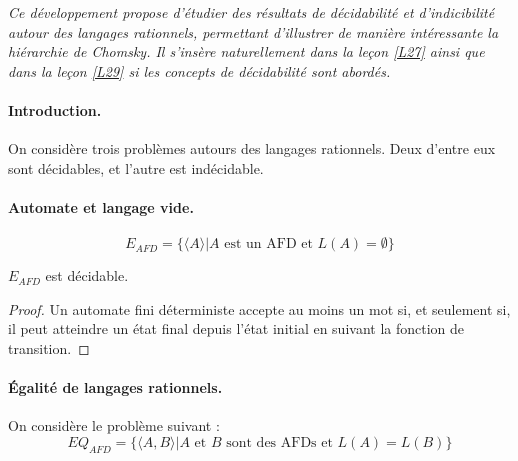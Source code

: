 

\textit{
Ce développement propose d'étudier des résultats de décidabilité et d’indicibilité autour des langages rationnels, permettant d'illustrer de manière intéressante la hiérarchie de Chomsky. Il s'insère naturellement dans la leçon \ref{L27} ainsi que dans la leçon \ref{L29} si les concepts de décidabilité sont abordés.}

\paragraph{Introduction.} On considère trois problèmes autours des langages rationnels. Deux d'entre eux sont décidables, et l'autre est indécidable.

\paragraph{Automate et langage vide.}
$$
E_{AFD} = \{\langle A \rangle | A \text{ est un AFD et } L(A)=\emptyset \} 
$$

\begin{theorem}
$E_{AFD}$ est décidable.
\end{theorem}

\begin{proof}
Un automate fini déterministe accepte au moins un mot si, et seulement si, il peut atteindre un état final depuis l'état initial en suivant la fonction de transition.\newline


\end{proof}


\paragraph{Égalité de langages rationnels.} On considère le problème suivant :
$$
EQ_{AFD} =\{\langle A,B \rangle | \text{$A$ et $B$ sont des AFDs et } L(A)=L(B) \} 
$$

